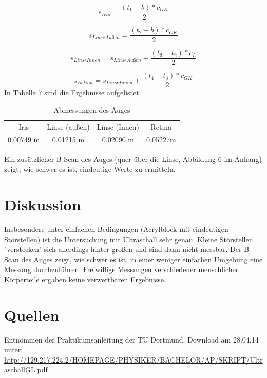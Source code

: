 \documentclass[11pt,ngerman,a4paper]{article}
\begin{document}
\begin{equation}
s_{Iris}=\frac{(t_1-b)*c_{GK}}{2}
\end{equation}

\begin{equation}
s_{LinseAußen}=\frac{(t_2-b)*c_{GK}}{2}
\end{equation}

\begin{equation}
s_{LinseInnen}=s_{LinseAußen}+\frac{(t_3-t_2)*c_L}{2}
\end{equation}

\begin{equation}
s_{Retina}=s_{LinseInnen}+\frac{(t_4-t_3)*c_{GK}}{2}
\end{equation}
\newline
In Tabelle 7 sind die Ergebnisse aufgelistet.
\begin{table}[h]
\centering
 \begin{tabular}{|c|c|c|c|}
 Iris & Linse (außen) & Linse (Innen) & Retina \\
0.00749 m & 0.01215 m & 0.02090 m & 0.05227m \\
 \end{tabular}
\label{7}
\caption{Abmessungen des Auges}
\end{table}
\newline
Ein zusätzlicher B-Scan des Auges (quer über die Linse, Abbildung 6 im Anhang) zeigt, wie schwer es ist, eindeutige Werte zu ermitteln.

\section{Diskussion}
Insbesondere unter einfachen Bedingungen (Acrylblock mit eindeutigen Störstellen) ist die Untersuchung mit Ultraschall sehr genau. Kleine Störstellen "verstecken" sich allerdings hinter großen und sind dann nicht messbar. Der B-Scan des Auges zeigt, wie schwer es ist, in einer weniger einfachen Umgebung eine Messung durchzuführen. Freiwillige Messungen verschiedener menschlicher Körperteile ergaben keine verwertbaren Ergebnisse.

\section{Quellen}
\begin{enumerate}[{[}1{]}]
\item Entnommen der Praktikumsanleitung \textit{} der TU Dortmund. Download am 28.04.14 unter:\\
 \url{http://129.217.224.2/HOMEPAGE/PHYSIKER/BACHELOR/AP/SKRIPT/UltraschallGL.pdf}
\end{enumerate}
\end{document}

